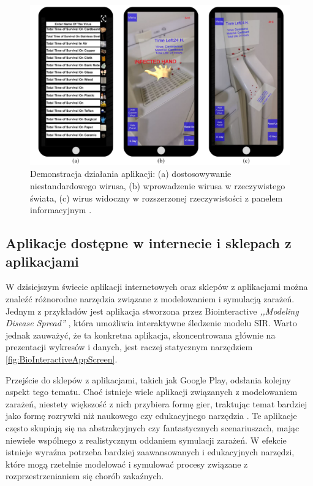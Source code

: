 \begin{figure}[h!]
	\includegraphics[width=\linewidth]{VirusIn3DSpaces.png}
	\caption{Demonstracja działania aplikacji: (a) dostosowywanie niestandardowego wirusa, (b) wprowadzenie wirusa w rzeczywistego świata, (c) wirus widoczny w rozszerzonej rzeczywistości z panelem informacyjnym \cite{bib:artykul2}.}
	\label{fig:3Dapp}
\end{figure}

\subsection{\textbf{Aplikacje dostępne w internecie i sklepach z aplikacjami}}

W dzisiejszym świecie aplikacji internetowych oraz sklepów z aplikacjami można znaleźć różnorodne narzędzia związane z modelowaniem i symulacją zarażeń. Jednym z przykładów jest aplikacja stworzona przez Biointeractive \textit {,,Modeling Disease Spread''} \cite{bib:BioInteractiveApp}, która umożliwia interaktywne śledzenie modelu SIR. Warto jednak zauważyć, że ta konkretna aplikacja, skoncentrowana głównie na prezentacji wykresów i danych, jest raczej statycznym narzędziem \ref{fig:BioInteractiveAppScreen}.

Przejście do sklepów z aplikacjami, takich jak Google Play, odsłania kolejny aspekt tego tematu. Choć istnieje wiele aplikacji związanych z modelowaniem zarażeń, niestety większość z nich przybiera formę gier, traktując temat bardziej jako formę rozrywki niż naukowego czy edukacyjnego narzędzia \cite{bib:PlagueInc} \cite{bib:EpidemicSimulator}. Te aplikacje często skupiają się na abstrakcyjnych czy fantastycznych scenariuszach, mając niewiele wspólnego z realistycznym oddaniem symulacji zarażeń. W efekcie istnieje wyraźna potrzeba bardziej zaawansowanych i edukacyjnych narzędzi, które mogą rzetelnie modelować i symulować procesy związane z rozprzestrzenianiem się chorób zakaźnych.


